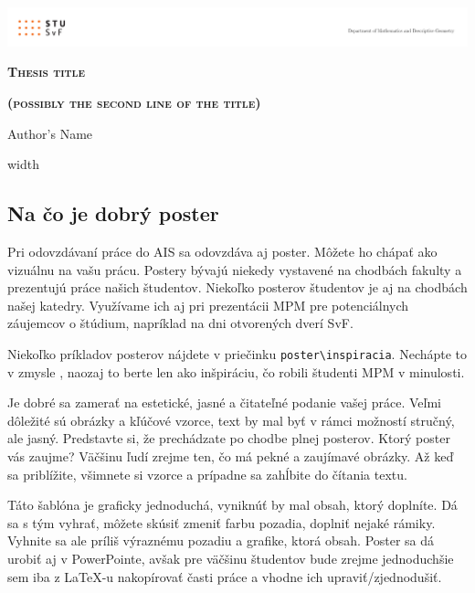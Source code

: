 \documentclass[portrait,a0]{a0poster}
\begin{document}
	\renewcommand{\baselinestretch}{1.5} %
	\fontsize{25pt}{20pt} %
	\selectfont
	
	\centerline{\includegraphics[width=\paperwidth]{header/header.pdf}}
	\centerline{\huge \textsc{\textbf{Thesis title}}}
	\centerline{\huge \textsc{\textbf{(possibly the second line of the title)}}}
	\vskip 1cm 
	\centerline{\Large Author's Name}
	\vskip 0.5cm
	\leaders\vrule width \linewidth\vskip 3pt

	
	\begin{multicols}{3} %
%	

	\section*{Na čo je dobrý poster}
	
	Pri odovzdávaní práce do AIS sa odovzdáva aj poster. Môžete ho chápať ako vizuálnu  na vašu prácu. Postery bývajú niekedy vystavené na chodbách fakulty a prezentujú práce našich študentov. Niekoľko posterov študentov je aj na chodbách našej katedry. Využívame ich aj pri prezentácii MPM pre potenciálnych záujemcov o štúdium, napríklad na dni otvorených dverí SvF.
	
	Niekoľko príkladov posterov nájdete v priečinku \verb*|poster\inspiracia|. Nechápte to v zmysle , naozaj to berte len ako inšpiráciu, čo robili študenti MPM v minulosti.
	
	Je dobré sa zamerať na estetické, jasné a čitateľné podanie vašej práce. Veľmi dôležité sú obrázky a kľúčové vzorce, text by mal byť v rámci možností stručný, ale jasný. Predstavte si, že prechádzate po chodbe plnej posterov. Ktorý poster vás zaujme? Väčšinu ľudí zrejme ten, čo má pekné a zaujímavé obrázky. Až keď sa priblížite, všimnete si vzorce a prípadne sa zahĺbite do čítania textu.
	
	Táto šablóna je graficky jednoduchá, vyniknúť by mal obsah, ktorý doplníte. Dá sa s tým vyhrať, môžete skúsiť zmeniť farbu pozadia, doplniť nejaké rámiky. Vyhnite sa ale príliš výraznému pozadiu a grafike, ktorá  obsah. Poster sa dá urobiť aj v PowerPointe, avšak pre väčšinu študentov bude zrejme jednoduchšie sem iba z LaTeX-u nakopírovať časti práce a vhodne ich upraviť/zjednodušiť.
	

\end{multicols}
\end{document}

